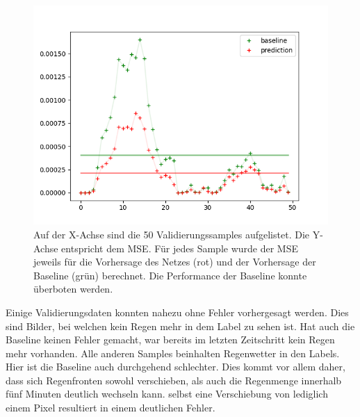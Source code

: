 \begin{figure}[h]
	\centering
	\includegraphics[width=\linewidth]{pics/mse_baseline.png}
	\caption[Vergleich zwischen Baseline und Netzvorhersage.]{Auf der X-Achse sind die 50 Validierungssamples aufgelistet. Die Y-Achse entspricht dem MSE. Für jedes Sample wurde der MSE jeweils für die Vorhersage des Netzes (rot) und der Vorhersage der Baseline (grün) berechnet. Die Performance der Baseline konnte überboten werden.}
	\label{vglBaseline1}
\end{figure}

Einige Validierungsdaten konnten nahezu ohne Fehler vorhergesagt werden. Dies sind Bilder, bei welchen kein Regen mehr in dem Label zu sehen ist. Hat auch die Baseline keinen Fehler gemacht, war bereits im letzten Zeitschritt kein Regen mehr vorhanden. Alle anderen Samples beinhalten Regenwetter in den Labels. Hier ist die Baseline auch durchgehend schlechter. Dies kommt vor allem daher, dass sich Regenfronten sowohl verschieben, als auch die Regenmenge innerhalb fünf Minuten deutlich wechseln kann. selbst eine Verschiebung von lediglich einem Pixel resultiert in einem deutlichen Fehler.

